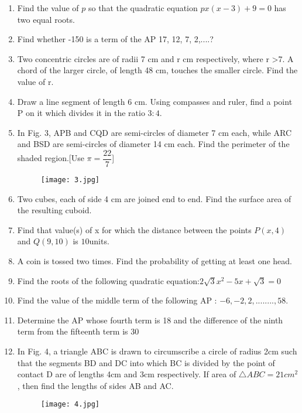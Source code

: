\documentclass[12pt,-letter paper]{article}
\providecommand{\brak}[1]{\ensuremath{\left(#1\right)}}
\theoremstyle{remark}
\begin{document}
\begin{enumerate}
    \item Find the value of $p$ so that the quadratic equation $px\brak{x-3}+9=0$ has two equal roots.
    \item Find whether -150 is a term of the AP 17, 12, 7, 2,....?
    \item 	Two concentric circles are of radii 7 cm and r cm respectively, where r >7. A chord of the larger circle, of length 48 cm, touches the smaller circle. Find the value of r.
    \item 	Draw a line segment of length 6 cm. Using compasses and ruler, find a point P on it which divides it in the ratio $3:4$.
    \item In Fig. 3, APB and CQD are semi-circles of diameter 7 cm each, while ARC and BSD are semi-circles of diameter 14 cm each. Find the perimeter of the shaded region.[Use $\pi=\dfrac{22}{7}$]
    \begin{figure}[h]
        \centering
        \texttt{[image: 3.jpg]}
    \end{figure}
    \item Two cubes, each of side 4 cm are joined end to end. Find the surface area of the resulting cuboid.
    \item Find that value(s) of x for which the distance between the points $P\brak{x,4}$ and $Q\brak{9,10}$ is $10$units.
    \item A coin is tossed two times. Find the probability of getting at least one head.\newpage
 
    \item Find the roots of the following quadratic equation:\newline $2\sqrt{3}x^2-5x+\sqrt{3}=0$
    \item Find the value of the middle term of the following AP :\newline
   $- 6, -2, 2,........, 58.$
  
   \item Determine the AP whose fourth term is 18 and the difference of the ninth term from the fifteenth term is 30
   \item In Fig. 4, a triangle ABC is drawn to circumscribe a circle of radius 2cm such that the segments BD and DC into which BC is divided by the point of contact D are of lengths 4cm and 3cm respectively. If area of $\triangle ABC=21cm^2$, then find the lengths of sides AB and AC.
    \begin{figure}[h]
        \centering
        \texttt{[image: 4.jpg]}
    \end{figure}
    

\end{enumerate}
\end{document}
